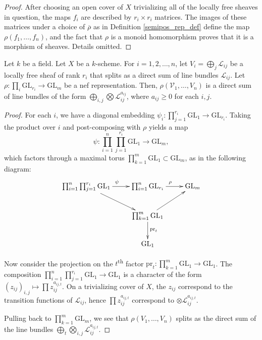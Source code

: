 \begin{proof}
After choosing an open cover of $X$ trivializing all of the locally free
sheaves in question, the maps $f_i$ are described by $r_i \times r_i$ matrices.
The images of these matrices under a choice of $\overline{\rho}$ as in
Definition \ref{semipos_rep_def} define the map $\rho(f_1,\ldots,f_n)$, and the
fact that $\rho$ is a monoid homomorphism proves that it is a morphism of
sheaves.
Details omitted.
\end{proof}

\begin{lemma}\label{rho_of_split_bundle}
Let $k$ be a field.
Let $X$ be a $k$-scheme.
For $i = 1, 2, \ldots, n$, let $V_i = \bigoplus_j \mathcal{L}_{ij}$ be a
locally free sheaf of rank $r_i$ that splits as a direct sum of line bundles
$\mathcal{L}_{ij}$.
Let $\rho : \prod_i \mathrm{GL}_{r_i} \to \mathrm{GL}_m$ be a nef
representation.
Then, $\rho(\mathcal{V}_1,\ldots,V_n)$ is a direct sum of line bundles of the
form $\bigoplus_{i,j}\bigotimes\mathcal{L}_{ij}^{a_{ij}}$, where $a_{ij}\ge0$ for
each $i,j$.
\end{lemma}

\begin{proof}
For each $i$, we have a diagonal embedding
$\psi_i : \prod_{j = 1}^{r_i}\mathrm{GL}_1 \to \mathrm{GL}_{r_i}$.
Taking the product over $i$ and post-composing with $\rho$ yields a map
$$
  \psi : \prod_{i = 1}^n \prod_{j = 1}^{r_i} \mathrm{GL}_1 \to \mathrm{GL}_m,
$$
which factors through a maximal torus
$\prod_{k = 1}^m \mathrm{GL}_1 \subset \mathrm{GL}_m$,
as in the following diagram:
$$
\xymatrix{
  \prod_{i = 1}^n \prod_{j = 1}^{r_i} \mathrm{GL}_1 \ar[r]^\psi \ar[rd] &
  \prod_{i = 1}^{n} \mathrm{GL}_{r_i} \ar[r]^\rho &
  \mathrm{GL}_m \\
    &
  \prod_{k = 1}^m \mathrm{GL}_1 \ar[ru] \ar[d]^{\mathrm{pr}_t} \\
    &
  \mathrm{GL}_1
}
$$

Now consider the projection on the $t$\textsuperscript{th} factor
$\mathrm{pr}_t : \prod_{k = 1}^m \mathrm{GL}_1\to \mathrm{GL}_1$.
The composition
$\prod_{i = 1}^n \prod_{j = 1}^{r_i} \mathrm{GL}_1\to \mathrm{GL}_1$ is a
character of the form $(z_{ij})_{i,j}\mapsto \prod z_{ij}^{a_{ij,t}}$.
On a trivializing cover of $X$, the $z_{ij}$ correspond to the transition
functions of $\mathcal{L}_{ij}$, hence $\prod z_{ij}^{a_{ij,t}}$ correspond to
$\otimes\mathcal{L}_{ij}^{a_{ij,t}}$.

Pulling back to $\prod_{k = 1}^m \mathrm{GL}_m$,
we see that $\rho(V_1,\ldots,V_n)$ splits as the direct sum of the line bundles
$\bigoplus_t \bigotimes_{i,j} \mathcal{L}_{ij}^{a_{ij,t}}$.
\end{proof}

